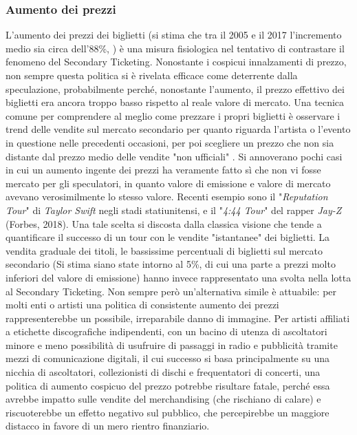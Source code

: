 \subsubsection{Aumento dei prezzi}
L'aumento dei prezzi dei biglietti (si stima che tra il 2005 e il 2017 l'incremento medio sia circa dell'88\%, \cite{tompkins2018ticket}) è una misura fisiologica nel tentativo di contrastare il fenomeno del Secondary Ticketing. Nonostante i cospicui innalzamenti di prezzo, non sempre questa politica si è rivelata efficace come deterrente dalla speculazione, probabilmente perché, nonostante l'aumento, il prezzo effettivo dei biglietti era ancora troppo basso rispetto al reale valore di mercato. 
Una tecnica comune per comprendere al meglio come prezzare i propri biglietti è osservare i trend delle vendite sul mercato secondario per quanto riguarda l'artista o l'evento in questione nelle precedenti occasioni, per poi scegliere un prezzo che non sia distante dal prezzo medio delle vendite "non ufficiali" \cite{tompkins2018ticket, courty2014pricing}.
Si annoverano pochi casi in cui un aumento ingente dei prezzi ha veramente fatto sì che non vi fosse mercato per gli speculatori, in quanto valore di emissione e valore di mercato avevano verosimilmente lo stesso valore. Recenti esempio sono il "\textit{Reputation Tour}" di \textit{Taylor Swift} negli stadi statiunitensi, e il "\textit{4:44 Tour}" del rapper \textit{Jay-Z} (Forbes, 2018). Una tale scelta si discosta dalla classica visione che tende a quantificare il successo di un tour con le vendite "istantanee" dei biglietti. 
La vendita graduale dei titoli, le bassissime percentuali di biglietti sul mercato secondario (Si stima siano state intorno al 5\%, di cui una parte a prezzi molto inferiori del valore di emissione) hanno invece rappresentato una svolta nella lotta al Secondary Ticketing. 
Non sempre però un'alternativa simile è attuabile: per molti enti o artisti una politica di consistente aumento dei prezzi rappresenterebbe un possibile, irreparabile danno di immagine. 
Per artisti affiliati a etichette discografiche indipendenti, con un bacino di utenza di ascoltatori minore e meno possibilità di usufruire di passaggi in radio e pubblicità tramite mezzi di comunicazione digitali, il cui successo si basa principalmente su una nicchia di ascoltatori, collezionisti di dischi e frequentatori di concerti, una politica di aumento cospicuo del prezzo potrebbe risultare fatale, perché essa avrebbe impatto sulle vendite del merchandising (che rischiano di calare) e riscuoterebbe un effetto negativo sul pubblico, che percepirebbe un maggiore distacco in favore di un mero rientro finanziario. 

